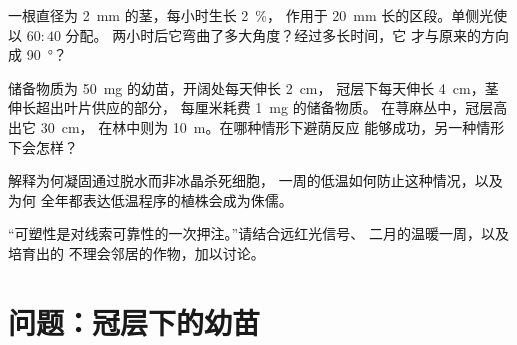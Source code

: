 \begin{exercise}[$\star\star$]\label{exo:b2:plant-plasticity:9}
一根直径为 \qty{2}{mm} 的茎，每小时生长 \qty{2}{\%}，
作用于 \qty{20}{mm} 长的区段。单侧光使以 $60 : 40$ 分配。
两小时后它弯曲了多大角度？经过多长时间，它
才与原来的方向成 \qty{90}{\degree}？
\end{exercise}

\begin{exercise}[$\star\star\star$]\label{exo:b2:plant-plasticity:10}
储备物质为 \qty{50}{mg} 的幼苗，开阔处每天伸长 \qty{2}{cm}，
冠层下每天伸长 \qty{4}{cm}，茎伸长超出叶片供应的部分，
每厘米耗费 \qty{1}{mg} 的储备物质。
在荨麻丛中，冠层高出它 \qty{30}{cm}，
在林中则为 \qty{10}{m}。在哪种情形下避荫反应
能够成功，另一种情形下会怎样？
\end{exercise}

\begin{exercise}[$\star\star\star$]\label{exo:b2:plant-plasticity:11}
解释为何凝固通过脱水而非冰晶杀死细胞，
一周的低温如何防止这种情况，以及为何
全年都表达低温程序的植株会成为侏儒。
\end{exercise}

\begin{exercise}[$\star\star\star$]\label{exo:b2:plant-plasticity:12}
“可塑性是对线索可靠性的一次押注。”请结合远红光信号、
二月的温暖一周，以及培育出的
不理会邻居的作物，加以讨论。
\end{exercise}

\section{问题：冠层下的幼苗}

